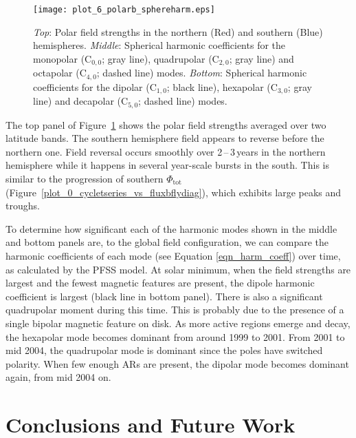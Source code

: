 \begin{figure}[!t]
\centerline{\texttt{[image: plot\_6\_polarb\_sphereharm.eps]}}
\caption[Global magnetic field spherical harmonic strengths over time.]{\emph{Top}: Polar field strengths in the northern (Red) and southern (Blue) hemispheres. \emph{Middle}: Spherical harmonic coefficients for the monopolar (C$_{0,0}$; gray line), quadrupolar (C$_{2,0}$; gray line) and octapolar (C$_{4,0}$; dashed line) modes. \emph{Bottom}: Spherical harmonic coefficients for the dipolar (C$_{1,0}$; black line), hexapolar (C$_{3,0}$; gray line) and decapolar (C$_{5,0}$; dashed line) modes.}
\label{plot_6_polarb_sphereharm}
\end{figure}

The top panel of Figure~\ref{plot_6_polarb_sphereharm} shows the polar field strengths averaged over two latitude bands. The southern hemisphere field appears to reverse before the northern one. Field reversal occurs smoothly over 2\,--\,3\,years in the northern hemisphere while it happens in several year-scale bursts in the south. This is similar to the progression of southern $\Phi_{\mathrm{tot}}$ (Figure~\ref{plot_0_cycletseries_vs_fluxbflydiag}), which exhibits large peaks and troughs.

To determine how significant each of the harmonic modes shown in the middle and bottom panels are, to the global field configuration, we can compare the harmonic coefficients of each mode (see Equation \ref{eqn_harm_coeff}) over time, as calculated by the \gls{PFSS} model. At solar minimum, when the field strengths are largest and the fewest magnetic features are present, the dipole harmonic coefficient is largest (black line in bottom panel). There is also a significant quadrupolar moment during this time. This is probably due to the presence of a single bipolar magnetic feature on disk. As more active regions emerge and decay, the hexapolar mode becomes dominant from around 1999 to 2001. From 2001 to mid 2004, the quadrupolar mode is dominant since the poles have switched polarity. When few enough \glspl{AR} are present, the dipolar mode becomes dominant again, from mid 2004 on.


\section{Conclusions and Future Work}\label{discussion}

